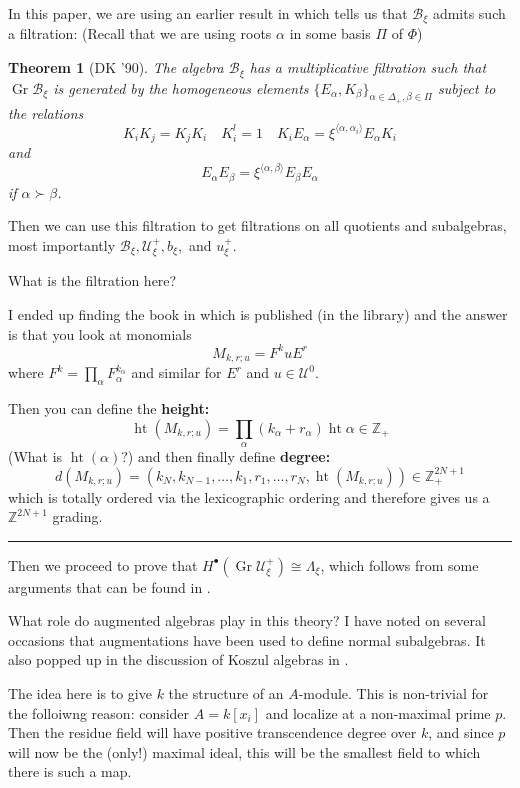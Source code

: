\documentclass[12pt]{article}
\theoremstyle{nonumberbreak}
\theoremstyle{changebreak}
\newtheorem{thm}{Theorem}[subsection]
\theoremstyle{nonumberplain}
\theoremstyle{change}
\newcommand*{\bbZ}{\mathbb{Z}}
\DeclareMathOperator{\Gr}{Gr}
\newcommand*{\brk}{
\rule{2in}{.1pt}
}
\begin{document}
In this paper, we are using an earlier result in \cite{de-concini} which tells us that $\mathscr B_\xi$ admits such a filtration:
(Recall that we are using roots $\alpha$ in some basis $\Pi$ of $\Phi$)
\begin{thm}[DK '90]
	The algebra $\mathscr B_\xi$ has a multiplicative filtration such that $\Gr \mathscr B_\xi$ is generated by the homogeneous elements $\{E_\alpha,K_\beta\}_{\alpha\in \Delta_+,\beta\in \Pi}$
	subject to the relations
	\[K_iK_j=K_jK_i\quad K_i^l=1\quad K_iE_\alpha=\xi^{\langle \alpha,\alpha_i\rangle} E_\alpha K_i\]
	and
	\[E_\alpha E_\beta=\xi^{\langle\alpha,\beta\rangle}E_\beta E_\alpha\]
	if $\alpha\succ\beta$.
\end{thm}
Then we can use this filtration to get filtrations on all quotients and subalgebras, most importantly
$\mathscr B_\xi,\mathscr U_\xi^+, b_\xi,$ and $u_\xi^+$.
\begin{qst}
	What is the filtration here? 
\end{qst}
I ended up finding the book in which \cite{de-concini} is published (in the library) and the answer is that you look at 
monomials 
\[M_{k,r;u}=F^kuE^r\]
where $F^k=\prod_\alpha F_\alpha^{k_{\alpha}}$ and similar for $E^r$ and $u\in\mathcal U^0$.

Then you can define the \textbf{height:}
\[\operatorname{ht}(M_{k,r;u})=\prod_\alpha (k_\alpha+r_\alpha)\operatorname{ht}\alpha\in\bbZ_+\]
(What is $\operatorname{ht}(\alpha)?$) and then finally define \textbf{degree:}
\[d(M_{k,r;u})=(k_N,k_{N-1},\dots,k_1,r_1,\dots,r_N,\operatorname{ht}(M_{k,r;u}))\in\bbZ_+^{2N+1}\]
which is totally ordered via the lexicographic ordering and therefore gives us a $\bbZ^{2N+1}$ grading.

\brk

Then we proceed to prove that $H^\bullet(\Gr\mathcal U_\xi^+)\cong\Lambda_\xi$, which follows from some arguments that can be found 
in \cite{priddy}.
\begin{qst}
	What role do augmented algebras play in this theory? I have noted on several occasions that augmentations
	have been used to define normal subalgebras. It also popped up in the discussion of Koszul algebras in \cite{priddy}.
\end{qst}

The idea here is to give $k$ the structure of an $A$-module. This is non-trivial for the folloiwng reason:
consider $A=k[x_i]$ and localize at a non-maximal prime $p$. Then the residue field will have positive transcendence degree
over $k$, and since $p$ will now be the (only!) maximal ideal, this will be the smallest field to which there is such a map.
\end{document}
